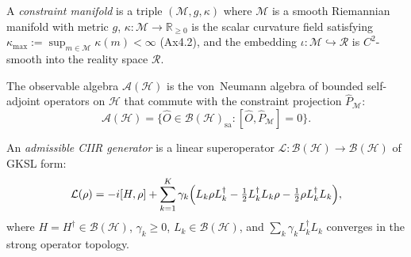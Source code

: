 \begin{definition}
\label{def:c9:manifold}
A \emph{constraint manifold} is a triple $(\mathcal{M}, g, \kappa)$
where $\mathcal{M}$ is a smooth Riemannian manifold with metric $g$,
$\kappa : \mathcal{M} \to \mathbb{R}_{\geq 0}$ is the scalar curvature
field satisfying $\kappa_{\max} := \sup_{m\in\mathcal{M}} \kappa(m) < \infty$
(Ax4.2), and the embedding $\iota : \mathcal{M} \hookrightarrow \mathcal{R}$
is $C^2$-smooth into the reality space $\mathcal{R}$.
\end{definition}

\begin{definition}
\label{def:c9:obs}
The observable algebra $\mathcal{A}(\mathcal{H})$ is the von~Neumann
algebra of bounded self-adjoint operators on $\mathcal{H}$ that commute
with the constraint projection $\hat{P}_{\mathcal{M}}$:
\begin{equation}
  \mathcal{A}(\mathcal{H}) = \bigl\{
    \hat{O} \in \mathcal{B}(\mathcal{H})_{\mathrm{sa}} :
    [\hat{O}, \hat{P}_{\mathcal{M}}] = 0
  \bigr\}.
\end{equation}
\end{definition}

\begin{definition}
\label{def:c9:generator}
An \emph{admissible CIIR generator} is a linear superoperator
$\mathcal{L} : \mathcal{B}(\mathcal{H}) \to \mathcal{B}(\mathcal{H})$
of GKSL form:
\begin{equation}
  \mathcal{L}(\rho) = -i[H, \rho]
    + \sum_{k=1}^{K} \gamma_k \Bigl(
      L_k \rho L_k^\dagger
      - \tfrac{1}{2} L_k^\dagger L_k \rho
      - \tfrac{1}{2} \rho L_k^\dagger L_k
    \Bigr),
  \label{eq:c9:gksl}
\end{equation}
where $H = H^\dagger \in \mathcal{B}(\mathcal{H})$, $\gamma_k \geq 0$,
$L_k \in \mathcal{B}(\mathcal{H})$, and
$\sum_k \gamma_k L_k^\dagger L_k$ converges in the strong operator
topology.
\end{definition}

